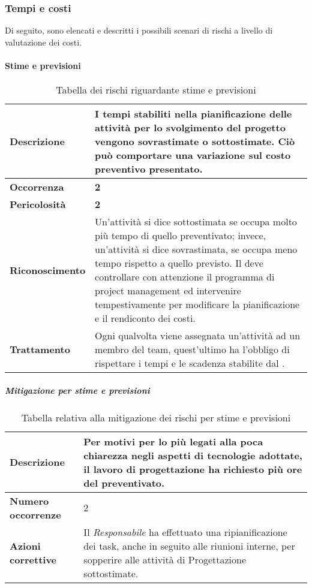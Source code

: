 \subsubsection{Tempi e costi}

Di seguito, sono elencati e descritti i possibili scenari di rischi a livello di valutazione dei costi.

\paragraph{Stime e previsioni}

\begin{table}[H]
	\begin{center}
		\begin{tabular}{|l | p{11cm}|}
			\hline
			\textbf{Descrizione}	& I tempi stabiliti nella pianificazione delle attività per lo svolgimento del progetto vengono sovrastimate o sottostimate. Ciò può comportare una variazione sul costo preventivo presentato. \\
			\hline
			\textbf{Occorrenza}	&	\textbf{2}	\\
			\hline
			\textbf{Pericolosità}	&	\textbf{2}	\\
			\hline
			\textbf{Riconoscimento}	& Un’attività si dice sottostimata se occupa molto più tempo di quello preventivato; invece, un'attività si dice sovrastimata, se occupa meno tempo rispetto a quello previsto. Il \textit{\RdP} deve controllare con attenzione il programma di project management ed intervenire tempestivamente per modificare la pianificazione e il rendiconto dei costi.	\\
			\hline
			\textbf{Trattamento}	&	Ogni qualvolta viene assegnata un'attività ad un membro del team, quest'ultimo ha l'obbligo di rispettare i tempi e le scadenza stabilite dal \textit{\RdP}.	\\
			\hline
		\end{tabular}
		\caption{Tabella dei rischi riguardante stime e previsioni}
	\end{center}
\end{table}

\subparagraph{Mitigazione per stime e previsioni}

\begin{table}[H]
	\begin{center}
		\begin{tabular}{|l | p{11cm}|}
			\hline
			\textbf{Descrizione}	& Per motivi per lo più legati alla poca chiarezza negli aspetti di tecnologie
			adottate, il lavoro di progettazione ha richiesto più ore del preventivato. \\
			\hline
			\textbf{Numero occorrenze} & 2 \\
			\hline
			\textbf{Azioni correttive}	&	Il \textit{Responsabile} ha effettuato una ripianificazione dei task, anche in seguito alle riunioni interne, per sopperire alle attività di Progettazione sottostimate.\\
			\hline
		\end{tabular}
		\caption{Tabella relativa alla mitigazione dei rischi per stime e previsioni}
	\end{center}
\end{table}


